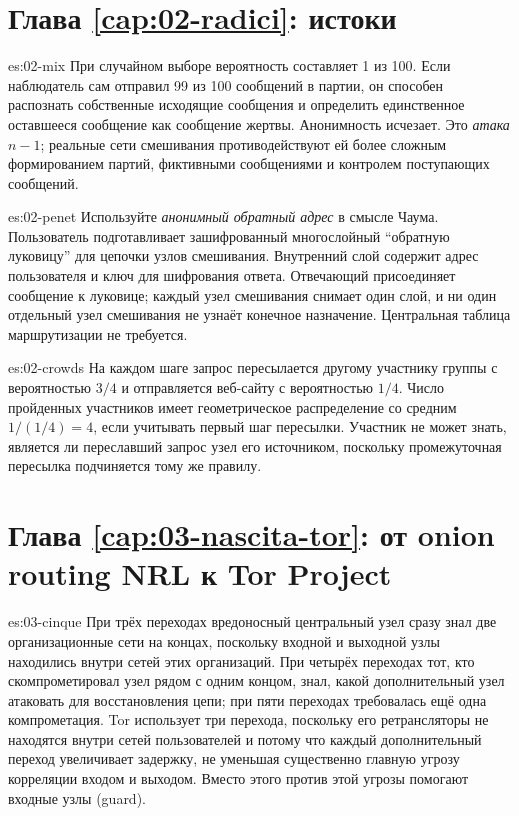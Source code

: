 \section*{Глава \ref{cap:02-radici}: истоки}

\begin{soluzione}{es:02-mix}
При случайном выборе вероятность составляет 1 из 100. Если наблюдатель сам отправил 99 из 100 сообщений в партии, он способен распознать собственные исходящие сообщения и определить единственное оставшееся сообщение как сообщение жертвы. Анонимность исчезает. Это \emph{атака $n-1$}; реальные сети смешивания противодействуют ей более сложным формированием партий, фиктивными сообщениями и контролем поступающих сообщений.
\end{soluzione}

\begin{soluzione}{es:02-penet}
Используйте \emph{анонимный обратный адрес} в смысле Чаума. Пользователь подготавливает зашифрованный многослойный \enquote{обратную луковицу} для цепочки узлов смешивания. Внутренний слой содержит адрес пользователя и ключ для шифрования ответа. Отвечающий присоединяет сообщение к луковице; каждый узел смешивания снимает один слой, и ни один отдельный узел смешивания не узнаёт конечное назначение. Центральная таблица маршрутизации не требуется.
\end{soluzione}

\begin{soluzione}{es:02-crowds}
На каждом шаге запрос пересылается другому участнику группы с вероятностью $3/4$ и отправляется веб-сайту с вероятностью $1/4$. Число пройденных участников имеет геометрическое распределение со средним $1/(1/4) = 4$, если учитывать первый шаг пересылки. Участник не может знать, является ли переславший запрос узел его источником, поскольку промежуточная пересылка подчиняется тому же правилу.
\end{soluzione}

\section*{Глава \ref{cap:03-nascita-tor}: от onion routing NRL к Tor Project}

\begin{soluzione}{es:03-cinque}
При трёх переходах вредоносный центральный узел сразу знал две организационные сети на концах, поскольку входной и выходной узлы находились внутри сетей этих организаций. При четырёх переходах тот, кто скомпрометировал узел рядом с одним концом, знал, какой дополнительный узел атаковать для восстановления цепи; при пяти переходах требовалась ещё одна компрометация. Tor использует три перехода, поскольку его ретрансляторы не находятся внутри сетей пользователей и потому что каждый дополнительный переход увеличивает задержку, не уменьшая существенно главную угрозу корреляции входом и выходом. Вместо этого против этой угрозы помогают входные узлы (guard).
\end{soluzione}

